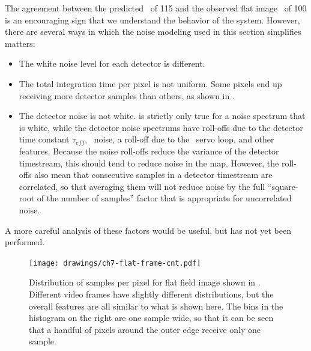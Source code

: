The agreement between the predicted \NETD\ of \SI{115}{\mK} and the observed flat image \NETD\ of \SI{100}{\mK} is an encouraging sign that we understand the behavior of the system.
However, there are several ways in which the noise modeling used in this section simplifies matters:
\begin{itemize}
\item The white noise level for each detector is different.
\item The total integration time per pixel is not uniform.
      Some pixels end up receiving more detector samples than others, as shown in .
\item The detector noise is not white.
       is strictly only true for a noise spectrum that is white, while the detector noise spectrums have roll-offs due to the detector time constant $\tau_{eff}$, \SQUID\ noise, a roll-off due to the \SQUID\ servo loop, and other features.
      Because the noise roll-offs reduce the variance of the detector timestream, this should tend to reduce noise in the map.
      However, the roll-offs also mean that consecutive samples in a detector timestream are correlated, so that averaging them will not reduce noise by the full ``square-root of the number of samples'' factor that is appropriate for uncorrelated noise.
\end{itemize}
A more careful analysis of these factors would be useful, but has not yet been performed.

\begin{figure}
\centering
\texttt{[image: drawings/ch7-flat-frame-cnt.pdf]}
\caption[Samples per pixel in image]{
  Distribution of samples per pixel for flat field image shown in .
  Different video frames have slightly different distributions, but the overall features are all similar to what is shown here.
  The bins in the histogram on the right are one sample wide, so that it can be seen that a handful of pixels around the outer edge receive only one sample.
}
\label{fig:ch7-flat-frame-cnt}
\end{figure}



